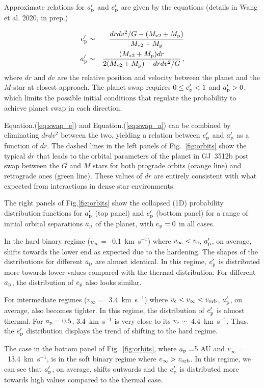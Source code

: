 \documentclass[twocolumn]{aastex62}
\begin{document}
{ Approximate relations for $a_{\rm p}^\prime$ and $e_{\rm p}^\prime$ are given by the equations (details in Wang et al. 2020, in prep.) 

\begin{eqnarray}\label{eq:swap_e}
e_{\rm p}^\prime &\sim& \frac{drdv^2/G-(M_{*2}+M_{\rm p})}{M_{*2}+M_{\rm p}}\\
a_{\rm p}^\prime &\sim& \frac{(M_{*2}+M_{\rm p})dr}{2(M_{*2}+M_{\rm p})-drdv^2/G}\,,\label{eq:swap_a}
\end{eqnarray}
where  $dr$ and $dv$ are the relative position and velocity between the planet and the $M$-star at closest approach. The planet swap requires $0 \le e_{\rm p}^\prime < 1$ and $a_{\rm p}^\prime >0$, which limits the possible initial conditions that regulate the probability to achieve planet swap in each direction.} 

Equation.(\ref{eq:swap_e}) and Equation.(\ref{eq:swap_a}) can be combined by eliminating $drdv^2$ between the two, yielding a relation  between $e_{\rm p}^\prime$ 
and $a_{\rm p}^\prime$ as a function of $dr$. The dashed lines in the left panels of Fig.~\ref{fig:orbits} show the typical $dr$ that leads to the orbital parameters of the planet in GJ~3512b post swap between the $G$ and $M$ stars for both prograde orbits (orange line) and retrograde ones (green line). 
These values of $dr$ are entirely consistent with what expected from interactions in dense star environments.



The right panels of Fig,\ref{fig:orbits} show the collapsed (1D) probability distribution functions for $a_{\rm p}^\prime$ (top panel) 
and $e_{\rm p}^\prime$ (bottom panel) for a range of initial orbital separations $a_{\rm p}$ of the planet, with $e_{\rm p}=0$ in all cases. 
{\color{red} In the hard binary regime ($v_\infty=$~0.1~km~s$^{-1}$) where $v_\infty < v_{\rm c}$,  $a_{\rm p}^\prime$, on average, shifts towards the lower end as expected due to the hardening. The shapes of the distributions for different $a_{\rm p}$ are almost identical.  In this regime, $e_{\rm p}^\prime$ is distributed more towards lower values compared with the thermal distribution. For different $a_{\rm p}$, the distribution of $e_{\rm p}$ also looks similar.

For intermediate regimes ($v_\infty=$~3.4~km~s$^{-1}$) where $v_{\rm c} < v_\infty < v_{\rm orb}$,  $a_{\rm p}^\prime$, on average, also becomes tighter. In this regime, the distribution of $e^\prime_{\rm p}$ is almost thermal. For $a_{\rm p}=0.5$, 3.4~km~s$^{-1}$ is very close to its $v_{\rm c}\sim$~4.4~km~s$^{-1}$. Thus, the  $e^\prime_{\rm p}$ distribution displays the trend of shifting to the hard regime. 

The case in the bottom panel of Fig.~\ref{fig:orbits}, where $a_{\rm p}=$5 AU and $v_\infty=$~13.4~km~s$^{-1}$, is in the soft binary regime where $v_\infty > v_{\rm orb}$. In this regime, we can see that $a_{\rm p}^\prime$, on average, shifts outwards and the $e_{\rm p}^\prime$ is distributed more towards high values compared to the thermal case.
}
\end{document}
